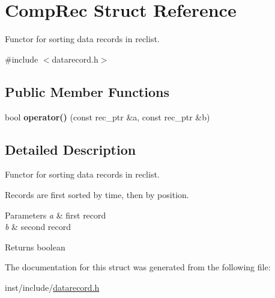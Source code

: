 \hypertarget{struct_comp_rec}{}\section{Comp\+Rec Struct Reference}
\label{struct_comp_rec}


Functor for sorting data records in {\ttfamily reclist}.  




{\ttfamily \#include $<$datarecord.\+h$>$}

\subsection*{Public Member Functions}
\begin{DoxyCompactItemize}
\item 
\mbox{\label{struct_comp_rec_a1c828ad19a4fa286890bd50c82f99a04}} 
bool {\bfseries operator()} (const rec\+\_\+ptr \&a, const rec\+\_\+ptr \&b)
\end{DoxyCompactItemize}


\subsection{Detailed Description}
Functor for sorting data records in {\ttfamily reclist}. 

Records are first sorted by time, then by position.


\begin{DoxyParams}{Parameters}
{\em a} & first record \\
\hline
{\em b} & second record \\
\hline
\end{DoxyParams}
\begin{DoxyReturn}{Returns}
boolean 
\end{DoxyReturn}


The documentation for this struct was generated from the following file\+:\begin{DoxyCompactItemize}
\item 
inst/include/\hyperlink{datarecord_8h}{datarecord.\+h}\end{DoxyCompactItemize}
